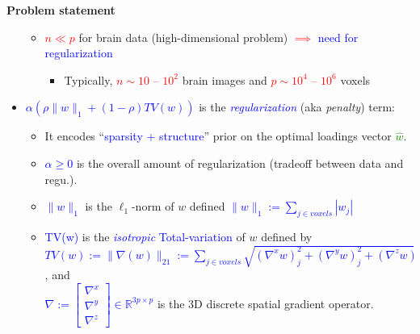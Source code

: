 \documentclass[french]{STIC_poster}
\begin{document}
\begin{frame}[t]
\begin{columns}[t]
\begin{column}{.48\linewidth}
\begin{sxbox}[\textwidth]{\textbf{Problem statement}}
\begin{itemize}
\begin{itemize}
                                        \item \textcolor{red}{$n \ll p$} for brain data (high-dimensional problem) \textcolor{red}{$\implies$} \textcolor{blue}{need for regularization}
                                          \begin{itemize}
                                          \item Typically, \textcolor{red}{$n \sim 10$ -- $10^2$} brain images and \textcolor{red}{$p \sim 10^4$ -- $10^6$} voxels
                                          \end{itemize}
                                      \end{itemize}
                                    \item  \textcolor{blue}{$\alpha \left(\rho \|w\|_1 + \left(1-\rho\right)TV(w)\right)$} is the \textcolor{blue}{\textit{regularization}}
                                      (aka \textit{penalty}) term:
                                    \begin{itemize}
                                      \item It encodes ``\textcolor{blue}{sparsity + structure}'' prior on the optimal loadings vector \textcolor{green}{$\hat{w}$}.
                                      \item \textcolor{blue}{$\alpha \ge 0$} is the overall amount of regularization (tradeoff between data and regu.).
                                        \item \textcolor{blue}{$\|w\|_1$} is the $\ell_1$-norm of $w$ defined \textcolor{blue}{$\|w\|_1 := \sum_{j \in voxels}{|w_j|}$}
                                      \item \textcolor{blue}{TV(w)} is the \textcolor{blue}{\textit{isotropic} Total-variation} of $w$ defined by\\
                                        \textcolor{blue}{$TV(w):=\|\nabla(w)\|_{21} :=\sum_{j \in voxels}{\sqrt{(\nabla^xw)_j^2+(\nabla^yw)_j^2+(\nabla^zw)_j^2}}$},
                                        and \\ \textcolor{blue}{$\nabla := \begin{bmatrix}\nabla^x \\ \nabla^y \\ \nabla^z \end{bmatrix} \in \mathbb{R}^{3p \times p}$}
                                        is the 3D discrete spatial gradient operator.

\end{itemize}
\end{itemize}
\end{sxbox}
\end{column}
\end{columns}
\end{frame}
\end{document}
